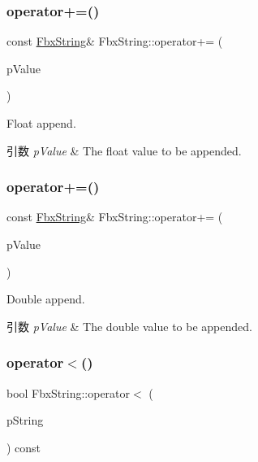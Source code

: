 \subsubsection{\texorpdfstring{operator+=()}{operator+=()}\hspace{0.1cm}{\footnotesize\ttfamily [5/6]}}
{\footnotesize\ttfamily const \hyperlink{class_fbx_string}{Fbx\+String}\& Fbx\+String\+::operator+= (\begin{DoxyParamCaption}\item[{float}]{p\+Value }\end{DoxyParamCaption})}

Float append. 
\begin{DoxyParams}{引数}
{\em p\+Value} & The float value to be appended. \\
\hline
\end{DoxyParams}
\mbox{\label{class_fbx_string_aad3e023ef09b10dae8a3ffaee703238d}} 
\subsubsection{\texorpdfstring{operator+=()}{operator+=()}\hspace{0.1cm}{\footnotesize\ttfamily [6/6]}}
{\footnotesize\ttfamily const \hyperlink{class_fbx_string}{Fbx\+String}\& Fbx\+String\+::operator+= (\begin{DoxyParamCaption}\item[{double}]{p\+Value }\end{DoxyParamCaption})}

Double append. 
\begin{DoxyParams}{引数}
{\em p\+Value} & The double value to be appended. \\
\hline
\end{DoxyParams}
\mbox{\label{class_fbx_string_a96940463f18a845a15580a1b90890677}} 
\subsubsection{\texorpdfstring{operator$<$()}{operator<()}\hspace{0.1cm}{\footnotesize\ttfamily [1/2]}}
{\footnotesize\ttfamily bool Fbx\+String\+::operator$<$ (\begin{DoxyParamCaption}\item[{const \hyperlink{class_fbx_string}{Fbx\+String} \&}]{p\+String }\end{DoxyParamCaption}) const}

